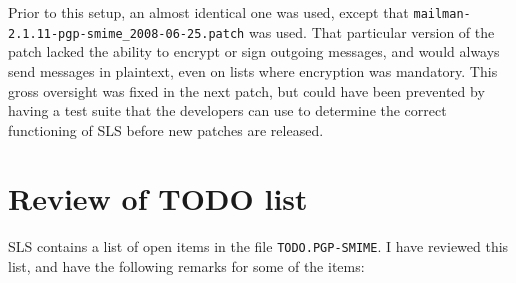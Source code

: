\documentclass[a4]{article}
\begin{document}
Prior to this setup, an almost identical one was used, except that \verb|mailman-2.1.11-pgp-smime_2008-06-25.patch| was used.
That particular version of the patch lacked the ability to encrypt or sign outgoing messages,
and would always send messages in plaintext, even on lists where encryption was mandatory.
This gross oversight was fixed in the next patch,
but could have been prevented by having a test suite
that the developers can use to determine the correct functioning of SLS before new patches are released.


\section{Review of TODO list}

SLS contains a list of open items in the file \verb|TODO.PGP-SMIME|.
I have reviewed this list, and have the following remarks for some of the items:
\end{document}
